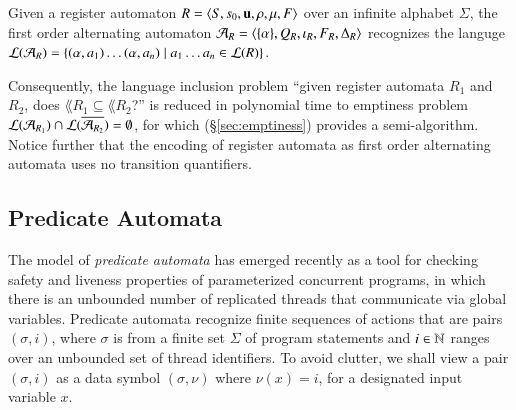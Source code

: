 \begin{proposition}\label{prop:register-alternating}
  Given a register automaton $R = \langle S,s_0,\mathbf u,\rho,\mu,F \rangle$
  over an infinite alphabet $\Sigma$, the first order alternating
  automaton $\mathcal{A}_R = \langle \{ \alpha \},Q_R,\iota_R,F_R,\Delta_R \rangle$
  recognizes the languge ${\mathcal L}({\mathcal{A}_R}) = \{  (\alpha,a_1) \ldots
    (\alpha,a_n) \mid a_1 \ldots a_n \in {\mathcal L}({R})  \}$. 
\end{proposition}

Consequently, the language inclusion problem ``given register automata
$R_1$ and $R_2$, does $\lang{R_1} \subseteq \lang{R_2}$?'' is reduced
in polynomial time to emptiness problem ${\mathcal L}({\mathcal{A}_{R_1}}) \cap
{\mathcal L}({\overline{\mathcal{A}_{R_2}}}) = \emptyset$, for which
(\S\ref{sec:emptiness}) provides a semi-algorithm. Notice further that
the encoding of register automata as first order alternating automata
uses no transition quantifiers.

\subsection{Predicate Automata}
\label{sec:pa}

The model of \emph{predicate automata} \cite{Farzan15,Farzan16} has
emerged recently as a tool for checking safety and liveness properties
of parameterized concurrent programs, in which there is an unbounded
number of replicated threads that communicate via global
variables. Predicate automata recognize finite sequences of actions
that are pairs $(\sigma,i)$, where $\sigma$ is from a finite set
$\Sigma$ of program statements and $i \in {\bf \mathbb{N}}$ ranges over an
unbounded set of thread identifiers. To avoid clutter, we shall view a
pair $(\sigma,i)$ as a data symbol $(\sigma,\nu)$ where $\nu(x)=i$,
for a designated input variable $x$.

